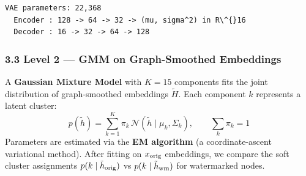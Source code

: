 \documentclass[11pt]{article}
\begin{document}
    \begin{Verbatim}[commandchars=\\\{\}]
VAE parameters: 22,368
  Encoder : 128 -> 64 -> 32 -> (mu, sigma^2) in R\^{}16
  Decoder : 16 -> 32 -> 64 -> 128
    \end{Verbatim}

    \subsubsection{3.3 Level 2 --- GMM on Graph-Smoothed
Embeddings}\label{level-2-gmm-on-graph-smoothed-embeddings}

A \textbf{Gaussian Mixture Model} with \(K=15\) components fits the
joint distribution of graph-smoothed embeddings \(\tilde{H}\). Each
component \(k\) represents a latent cluster: \[
p(\tilde{h}) = \sum_{k=1}^{K} \pi_k \, \mathcal{N}(\tilde{h} \mid \mu_k, \Sigma_k),
\qquad \sum_k \pi_k = 1
\] Parameters are estimated via the \textbf{EM algorithm} (a
coordinate-ascent variational method). After fitting on \(x_{\rm orig}\)
embeddings, we compare the soft cluster assignments
\(p(k \mid \tilde{h}_{\rm orig})\) vs \(p(k \mid \tilde{h}_{\rm wm})\)
for watermarked nodes.
\end{document}
